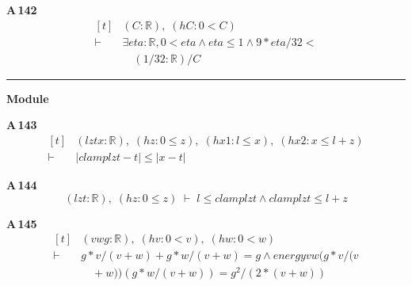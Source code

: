\noindent\textbf{A\,142}\quad{}
{\footnotesize\[ \begin{aligned}[t]
&(\mathit{C} : \mathbb{R} ),\; (\mathit{hC} : 0 < \mathit{C})\\
\vdash\;&\exists \mathit{eta} : \mathbb{R} , 0 < \mathit{eta} \wedge \mathit{eta} \leq 1 \wedge 9 * \mathit{eta} / 32 <\\
&\quad (1 / 32 : \mathbb{R} ) / \mathit{C}
\end{aligned} \]}

\vspace{4pt}\noindent\rule{\columnwidth}{0.4pt}\par\vspace{2pt}
\noindent\textbf{Module }\par\vspace{3pt}

\noindent\textbf{A\,143}\quad{}
{\footnotesize\[ \begin{aligned}[t]
&(\mathit{l} \mathit{z} \mathit{t} \mathit{x} : \mathbb{R} ),\; (\mathit{hz} : 0 \leq \mathit{z}),\; (\mathit{hx1} : \mathit{l} \leq \mathit{x}),\; (\mathit{hx2} : \mathit{x} \leq \mathit{l} + \mathit{z})\\
\vdash\;&|\mathit{clamp} \mathit{l} \mathit{z} \mathit{t} - \mathit{t}| \leq |\mathit{x} - \mathit{t}|
\end{aligned} \]}

\noindent\textbf{A\,144}\quad{}
{\footnotesize\[ (\mathit{l} \mathit{z} \mathit{t} : \mathbb{R} ),\; (\mathit{hz} : 0 \leq \mathit{z}) \;\vdash\; \mathit{l} \leq \mathit{clamp} \mathit{l} \mathit{z} \mathit{t} \wedge \mathit{clamp} \mathit{l} \mathit{z} \mathit{t} \leq \mathit{l} + \mathit{z} \]}

\noindent\textbf{A\,145}\quad{}
{\footnotesize\[ \begin{aligned}[t]
&(\mathit{v} \mathit{w} \mathit{g} : \mathbb{R} ),\; (\mathit{hv} : 0 < \mathit{v}),\; (\mathit{hw} : 0 < \mathit{w})\\
\vdash\;&\mathit{g} * \mathit{v} / (\mathit{v} + \mathit{w}) + \mathit{g} * \mathit{w} / (\mathit{v} + \mathit{w}) = \mathit{g} \wedge \mathit{energy} \mathit{v} \mathit{w} (\mathit{g} * \mathit{v} / (\mathit{v}\\
&\quad + \mathit{w})) (\mathit{g} * \mathit{w} / (\mathit{v} + \mathit{w})) = \mathit{g} ^{2} / (2 * (\mathit{v} + \mathit{w}))
\end{aligned} \]}

